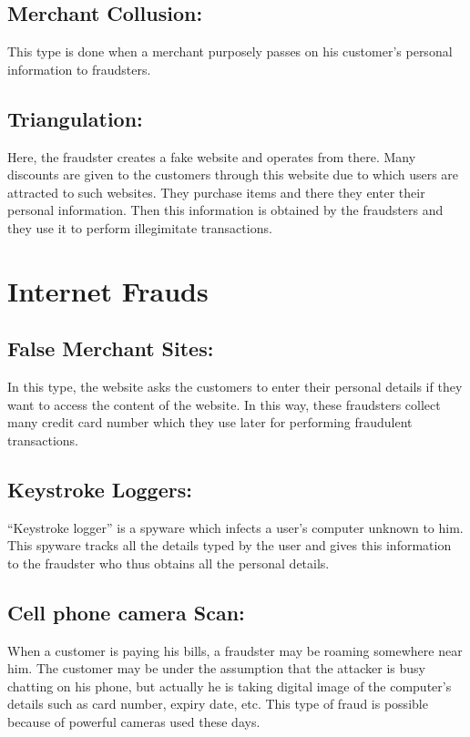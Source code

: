 \documentclass{report}
\begin{document}
\paragraph{}
\subsection{Merchant Collusion:}
This type is done when a merchant purposely passes on his customer’s personal information to fraudsters. 

\subsection{Triangulation:}
Here, the fraudster creates a fake website and operates from there. Many discounts are given to the customers through this website due to which users are attracted to such websites. They purchase items and there they enter their personal information. Then this information is obtained by the fraudsters and they use it to perform illegimitate transactions.  

\paragraph{}
\section{Internet Frauds}
\paragraph{}
\subsection{False Merchant Sites:}
 In this type, the website asks the customers to enter their personal details if they want to access the content of the website. In this way, these fraudsters collect many credit card number which they use later for performing fraudulent transactions.

\subsection{Keystroke Loggers:}
“Keystroke logger” is a spyware which infects a user’s computer unknown to him. This spyware tracks all the details typed by the user and gives this information to the fraudster who thus obtains all the personal details.

\subsection{Cell phone camera Scan:}
When a customer is paying his bills, a fraudster may be roaming somewhere near him. The customer may be under the assumption that the attacker is busy chatting on his phone, but actually he is taking digital image of the computer’s details such as card number, expiry date, etc. This type of fraud is possible because of powerful cameras used these days. 
\end{document}
